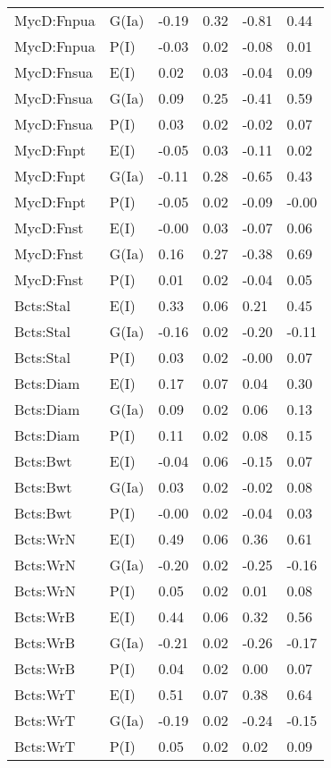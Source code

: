 \begin{center}
\begin{longtable}{|p{1.1in}|p{0.7in}|p{0.7in}|p{0.6in}|p{0.6in}|p{0.6in}|}
  MycD:Fnpua & G(Ia) & -0.19 & 0.32 & -0.81 & 0.44 \\ 
  MycD:Fnpua & P(I) & -0.03 & 0.02 & -0.08 & 0.01 \\ 
  MycD:Fnsua & E(I) & 0.02 & 0.03 & -0.04 & 0.09 \\ 
  MycD:Fnsua & G(Ia) & 0.09 & 0.25 & -0.41 & 0.59 \\ 
  MycD:Fnsua & P(I) & 0.03 & 0.02 & -0.02 & 0.07 \\ 
  MycD:Fnpt & E(I) & -0.05 & 0.03 & -0.11 & 0.02 \\ 
  MycD:Fnpt & G(Ia) & -0.11 & 0.28 & -0.65 & 0.43 \\ 
  MycD:Fnpt & P(I) & -0.05 & 0.02 & -0.09 & -0.00 \\ 
  MycD:Fnst & E(I) & -0.00 & 0.03 & -0.07 & 0.06 \\ 
  MycD:Fnst & G(Ia) & 0.16 & 0.27 & -0.38 & 0.69 \\ 
  MycD:Fnst & P(I) & 0.01 & 0.02 & -0.04 & 0.05 \\ 
  Bcts:Stal & E(I) & 0.33 & 0.06 & 0.21 & 0.45 \\ 
  Bcts:Stal & G(Ia) & -0.16 & 0.02 & -0.20 & -0.11 \\ 
  Bcts:Stal & P(I) & 0.03 & 0.02 & -0.00 & 0.07 \\ 
  Bcts:Diam & E(I) & 0.17 & 0.07 & 0.04 & 0.30 \\ 
  Bcts:Diam & G(Ia) & 0.09 & 0.02 & 0.06 & 0.13 \\ 
  Bcts:Diam & P(I) & 0.11 & 0.02 & 0.08 & 0.15 \\ 
  Bcts:Bwt & E(I) & -0.04 & 0.06 & -0.15 & 0.07 \\ 
  Bcts:Bwt & G(Ia) & 0.03 & 0.02 & -0.02 & 0.08 \\ 
  Bcts:Bwt & P(I) & -0.00 & 0.02 & -0.04 & 0.03 \\ 
  Bcts:WrN & E(I) & 0.49 & 0.06 & 0.36 & 0.61 \\ 
  Bcts:WrN & G(Ia) & -0.20 & 0.02 & -0.25 & -0.16 \\ 
  Bcts:WrN & P(I) & 0.05 & 0.02 & 0.01 & 0.08 \\ 
  Bcts:WrB & E(I) & 0.44 & 0.06 & 0.32 & 0.56 \\ 
  Bcts:WrB & G(Ia) & -0.21 & 0.02 & -0.26 & -0.17 \\ 
  Bcts:WrB & P(I) & 0.04 & 0.02 & 0.00 & 0.07 \\ 
  Bcts:WrT & E(I) & 0.51 & 0.07 & 0.38 & 0.64 \\ 
  Bcts:WrT & G(Ia) & -0.19 & 0.02 & -0.24 & -0.15 \\ 
  Bcts:WrT & P(I) & 0.05 & 0.02 & 0.02 & 0.09 \\ 

\end{longtable}
\end{center}
